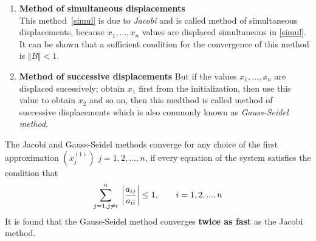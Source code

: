 \documentclass[aima203_lecturenotes_ku.tex]{subfiles}
\begin{document}
  \begin{enumerate}
  \item \textbf{Method of simultaneous displacements} \\[1mm]
    This method~\ref{simul} is due to \textit{Jacobi} and is called method of simultaneous displacements, because $x_1, ..., x_n$ values are displaced simultaneous in \ref{simul}. It can be shown that a sufficient condition for the convergence of this method is $\Vert B \Vert < 1$.
 \item \textbf{Method of successive displacements} But if the values $x_1,...,x_n$ are displaced sucessively; obtain $x_1$ first from the initialization, then use this value to obtain $x_2$ and so on, then this medthod is called method of successive displacements which is also commonly known as \textit{Gauss-Seidel method}.
 \end{enumerate}

 \begin{mdframed}
   The Jacobi and Gauss-Seidel methods converge for any choice of the first approximation $(x_j^{(1)})$ $j=1,2,...,n$, if every equation of the system satisfies the condition that
   \begin{equation}
     \label{converge}
     \sum ^{n}_{j=1, j \neq i} \; \left \vert \frac{a_{ij}}{a_{ii}} \right \vert \leq 1, \hspace{7mm} i=1,2,...,n
   \end{equation}
   It is found that the Gauss-Seidel method converges \textbf{twice as fast} as the Jacobi method.
 \end{mdframed}
\end{document}
